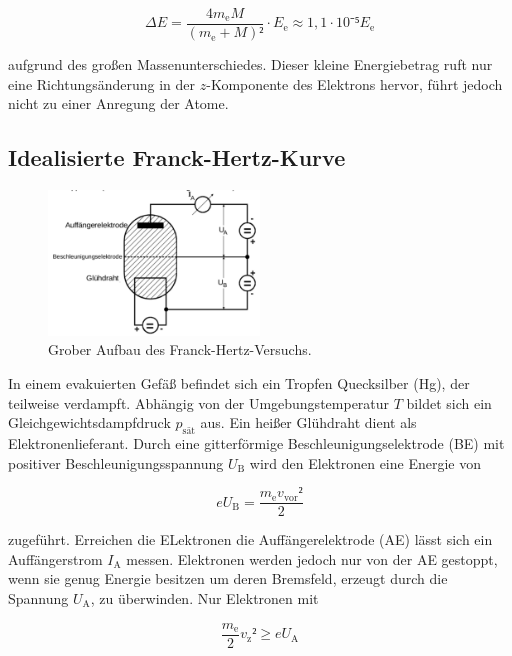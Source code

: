 \begin{equation}
	\Delta E=\frac{4m_\mathup{e}M}{(m_\mathup{e}+M)²}\cdot 		E_	\mathup{e} \approx 1,1\cdot 10⁻⁵ E_\mathup{e}
\end{equation}

aufgrund des großen Massenunterschiedes. 
Dieser kleine Energiebetrag ruft nur eine Richtungsänderung in der $z$-Komponente des Elektrons hervor, führt jedoch nicht zu einer Anregung der Atome.

\subsection{Idealisierte Franck-Hertz-Kurve}

\begin{figure}
	\includegraphics[width=0.5\textwidth]{Bilder/Aufbau.pdf}
	\caption{Grober Aufbau des Franck-Hertz-Versuchs.}
\end{figure}

In einem evakuierten Gefäß befindet sich ein Tropfen Quecksilber (Hg), der teilweise verdampft. 
Abhängig von der Umgebungstemperatur $T$ bildet sich ein Gleichgewichtsdampfdruck $p_\mathup{sät}$ aus. 
Ein heißer Glühdraht dient als Elektronenlieferant.
Durch eine gitterförmige Beschleunigungselektrode (BE) mit positiver Beschleunigungsspannung $U_\mathup{B}$ wird den Elektronen eine Energie von 

\begin{equation}
	e U_\mathup{B}=\frac{m_\mathup{e}v_\mathup{vor}²}{2}
\end{equation}

zugeführt. 
Erreichen die ELektronen die Auffängerelektrode (AE) lässt sich ein Auffängerstrom $I_\mathup{A}$ messen. 
Elektronen werden jedoch nur von der AE gestoppt, wenn sie genug Energie besitzen um deren Bremsfeld, erzeugt durch die Spannung $U_\mathup{A}$, zu überwinden. 
Nur Elektronen mit 

\begin{equation}
	\frac{m_\mathup{e}}{2}v_\mathup{z}² \geq e U_\mathup{A}
\end{equation}


